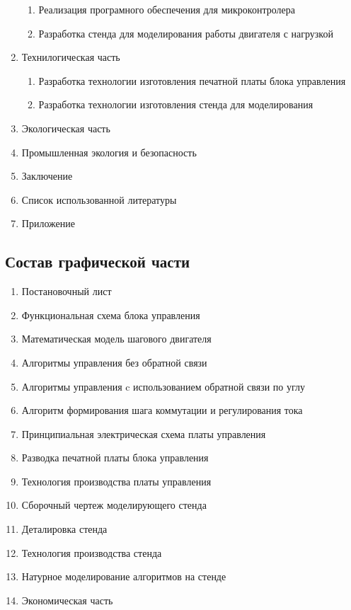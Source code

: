 \begin{enumerate}
\begin{enumerate}
            \item Реализация програмного обеспечения для микроконтролера
            \item Разработка стенда для моделирования работы двигателя с нагрузкой
        \end{enumerate}
    \item{Технилогическая часть}
        \begin{enumerate}
            \item Разработка технологии изготовления печатной платы блока управления
            \item Разработка технологии изготовления стенда для моделирования
        \end{enumerate}
    \item{Экологическая часть}
    \item{Промышленная экология и безопасность}
    \item{Заключение}
    \item{Список использованной литературы}
    \item{Приложение}
\end{enumerate}

\newpage
\subsection{Состав графической части}
\begin{enumerate}
    \item Постановочный лист
    \item Функциональная схема блока управления
    \item Математическая модель шагового двигателя
    \item Алгоритмы управления без обратной связи
    \item Алгоритмы управления c использованием обратной связи по углу
    \item Алгоритм формирования шага коммутации и регулирования тока
    \item Принципиальная электрическая схема платы управления
    \item Разводка печатной платы блока управления
    \item Технология производства платы управления
    \item Сборочный чертеж моделирующего стенда
    \item Деталировка стенда
    \item Технология производства стенда
    \item Натурное моделирование алгоритмов на стенде
    \item Экономическая часть
\end{enumerate}

